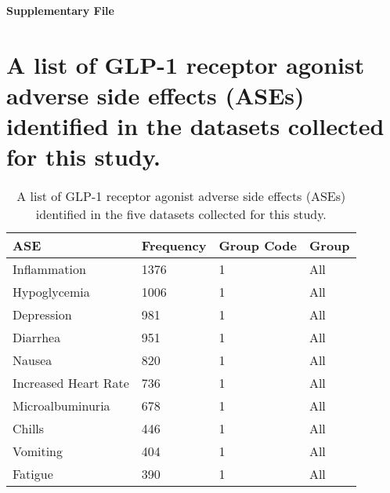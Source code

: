 \documentclass[referee,bst/sn-basic]{sn-jnl}%
\begin{document}
\newpage
\begin{appendices}

\textbf{Supplementary File}

\section{
A list of GLP-1 receptor agonist adverse side effects (ASEs) identified in the datasets collected for this study.}
\label{app1:All_ASEs}

\begin{longtable}{llll}
\caption{A list of GLP-1 receptor agonist adverse side effects (ASEs) identified in the five datasets collected for this study.}
\\
\hline
ASE                                      & Frequency & Group Code & Group                  \\ \hline
\endhead
%
\hline
\endfoot
%
\endlastfoot
%
Inflammation                             & 1376      & 1    & All                     \\
Hypoglycemia                             & 1006      & 1    & All                     \\
Depression                               & 981       & 1    & All                     \\
Diarrhea                                 & 951       & 1    & All                     \\
Nausea                                   & 820       & 1    & All                     \\
Increased Heart Rate                     & 736       & 1    & All                     \\
Microalbuminuria                         & 678       & 1    & All                     \\
Chills                                   & 446       & 1    & All                     \\
Vomiting                                 & 404       & 1    & All                     \\
Fatigue                                  & 390       & 1    & All                     \\

\end{longtable}
\end{appendices}
\end{document}
